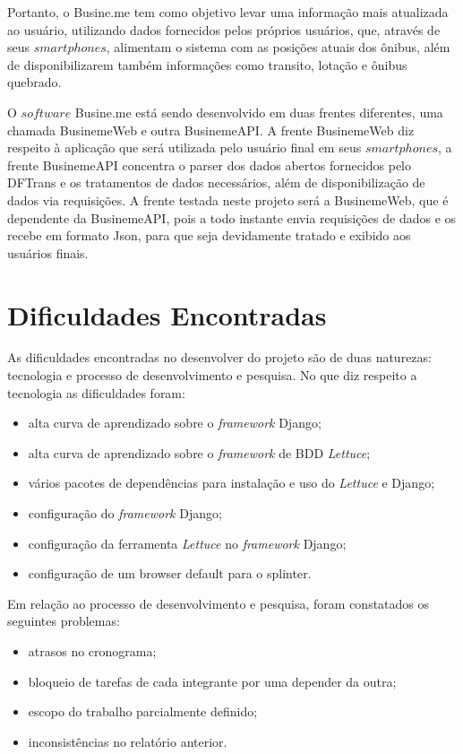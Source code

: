 Portanto, o Busine.me tem como objetivo levar uma informação mais atualizada ao usuário, utilizando dados fornecidos pelos próprios usuários, que, através de seus $smartphones$, alimentam o sistema com as posições atuais dos ônibus, além de disponibilizarem também informações como transito, lotação e ônibus quebrado.

O $software$ Busine.me está sendo desenvolvido em duas frentes diferentes, uma chamada BusinemeWeb e outra BusinemeAPI. A frente BusinemeWeb diz respeito à aplicação que será utilizada pelo usuário final em seus $smartphones$, a frente BusinemeAPI concentra o parser dos dados abertos fornecidos pelo DFTrans e os tratamentos de dados necessários, além de disponibilização de dados via requisições. A frente testada neste projeto será a BusinemeWeb, que é dependente da BusinemeAPI, pois a todo instante envia requisições de dados e os recebe em formato Json, para que seja devidamente tratado e exibido aos usuários finais. 


\section{Dificuldades Encontradas}

As dificuldades encontradas no desenvolver do projeto são de duas naturezas: tecnologia e processo de desenvolvimento e pesquisa. No que diz respeito a tecnologia as dificuldades foram:
	\begin{itemize}
		\item alta curva de aprendizado sobre o \textit{framework} Django;
		\item alta curva de aprendizado sobre o \textit{framework} de BDD \textit{Lettuce};
		\item vários pacotes de dependências para instalação e uso do \textit{Lettuce} e Django;
		\item configuração do \textit{framework} Django;
		\item configuração da ferramenta \textit{Lettuce} no \textit{framework} Django;
		\item configuração de um browser default para o splinter.
	\end{itemize}

Em relação ao processo de desenvolvimento e pesquisa, foram constatados os seguintes problemas:
	\begin{itemize}
		\item atrasos no cronograma;
		\item bloqueio de tarefas de cada integrante por uma depender da outra;
		\item escopo do trabalho parcialmente definido;
		\item inconsistências no relatório anterior.
	\end{itemize}